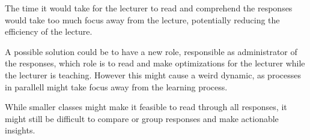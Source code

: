 The time it would take for the lecturer to read and comprehend the responses would take too much focus away from the lecture, potentially reducing the efficiency of the lecture. 

A possible solution could be to have a new role, responsible as administrator of the responses, which role is to read and make optimizations for the lecturer while the lecturer is teaching. However this might cause a weird dynamic, as processes in parallell might take focus away from the learning process.

While smaller classes might make it feasible to read through all responses, it might still be difficult to compare or group responses and make actionable insights. 

